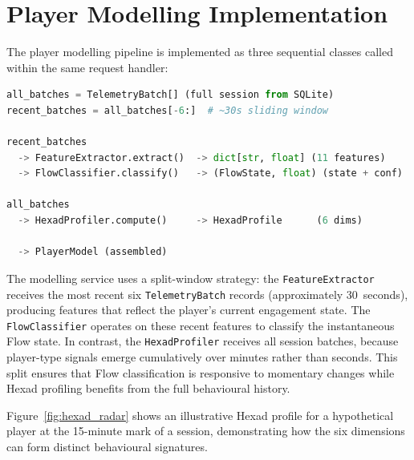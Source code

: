 \section{Player Modelling Implementation}

The player modelling pipeline is implemented as three sequential classes called within the same request handler:

\begin{lstlisting}[language=Python, caption={Player modelling pipeline flow.}]
all_batches = TelemetryBatch[] (full session from SQLite)
recent_batches = all_batches[-6:]  # ~30s sliding window

recent_batches
  -> FeatureExtractor.extract()  -> dict[str, float] (11 features)
  -> FlowClassifier.classify()   -> (FlowState, float) (state + conf)

all_batches
  -> HexadProfiler.compute()     -> HexadProfile      (6 dims)

  -> PlayerModel (assembled)
\end{lstlisting}

The modelling service uses a split-window strategy: the \texttt{FeatureExtractor} receives the most recent six \texttt{TelemetryBatch} records (approximately 30~seconds), producing features that reflect the player's current engagement state. The \texttt{FlowClassifier} operates on these recent features to classify the instantaneous Flow state. In contrast, the \texttt{HexadProfiler} receives all session batches, because player-type signals emerge cumulatively over minutes rather than seconds. This split ensures that Flow classification is responsive to momentary changes while Hexad profiling benefits from the full behavioural history.

Figure~\ref{fig:hexad_radar} shows an illustrative Hexad profile for a hypothetical player at the 15-minute mark of a session, demonstrating how the six dimensions can form distinct behavioural signatures.

